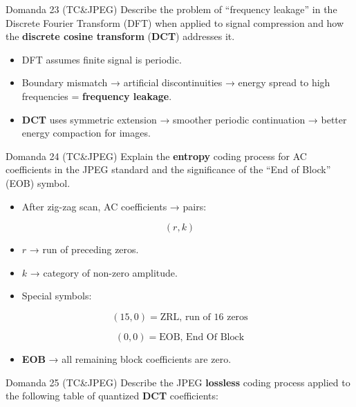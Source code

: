 \begin{questionbox}{Domanda 23}
(TC\&JPEG) Describe the problem of “frequency leakage” in the Discrete Fourier Transform (DFT) when applied to signal compression and how the \textbf{discrete cosine transform} (\textbf{DCT}) addresses it.
\end{questionbox}


\begin{itemize}
  \item DFT assumes finite signal is periodic.
  \item Boundary mismatch → artificial discontinuities → energy spread to high frequencies = \textbf{frequency leakage}.
  \item \textbf{DCT} uses symmetric extension → smoother periodic continuation → better energy compaction for images.
\end{itemize}



\begin{questionbox}{Domanda 24}
(TC\&JPEG) Explain the \textbf{entropy} coding process for AC coefficients in the JPEG standard and the significance of the “End of Block” (EOB) symbol.
\end{questionbox}


\begin{itemize}
  \item After zig-zag scan, AC coefficients → pairs:
\end{itemize}


$$
(r,k)
$$


\begin{itemize}
  \item $r$ → run of preceding zeros.
  \item $k$ → category of non-zero amplitude.
  \item Special symbols:
\end{itemize}


$$
(15,0) = \text{ZRL, run of 16 zeros}
$$



$$
(0,0) = \text{EOB, End Of Block}
$$


\begin{itemize}
  \item \textbf{EOB} → all remaining block coefficients are zero.
\end{itemize}



\begin{questionbox}{Domanda 25}
(TC\&JPEG) Describe the JPEG \textbf{lossless} coding process applied to the following table of quantized \textbf{DCT} coefficients:
\end{questionbox}

